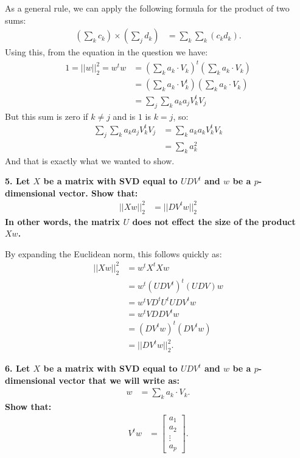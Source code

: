 \documentclass[12pt,hidelinks]{article}
\numberwithin{equation}{section}
\begin{document}
As a general rule, we can apply the following formula for the product of two
sums:
\begin{align}
\left(\sum_k c_k\right) \times \left(\sum_j d_k \right) &= \sum_k \sum_k (c_k d_k).
\end{align}
Using this, from the equation in the question we have:
\begin{align}
1 = || w ||_2^2 = w^t w &= \left(\sum_k a_k \cdot V_k \right)^t \left(\sum_k a_k \cdot V_k \right) \\
&= \left(\sum_k a_k \cdot V_k^t \right) \left(\sum_k a_k \cdot V_k \right) \\
&= \sum_j \sum_k a_k a_j V_k^t V_j
\end{align}
But this sum is zero if $k\neq j$ and is $1$ is $k=j$, so:
\begin{align}
\sum_j \sum_k a_k a_j V_k^t V_j &= \sum_k a_k a_k V_k^t V_k \\
&= \sum_k a_k^2
\end{align}
And that is exactly what we wanted to show.

\vspace*{12pt}

\textbf{5. Let $X$ be a matrix with SVD equal to $UDV^t$ and $w$ be a
$p$-dimensional vector. Show that:
\begin{align}
|| X w ||_2^2 &= || D V^t w ||_2^2
\end{align}
In other words, the matrix $U$ does not effect the size of the product $X w$.}

\vspace*{12pt}

By expanding the Euclidean norm, this follows quickly as:
\begin{align}
|| X w ||_2^2 &= w^t X^t X w\\
&= w^t (U D V^t)^t (U D V) w \\
&= w^t V D^t U^t U D V^t w \\
&= w^t V D D V^t w \\
&= (D V^t w)^t (D V^t w) \\
&= ||D V^t w ||_2^2.
\end{align}

\vspace*{12pt}

\textbf{6. Let $X$ be a matrix with SVD equal to $UDV^t$ and $w$ be a
$p$-dimensional vector that we will write as:}
\begin{align}
w &= \sum_k a_k \cdot V_k.
\end{align}
\textbf{Show that:}
\begin{align}
V^t w &= \begin{bmatrix} a_1 \\ a_2 \\ \vdots \\ a_p \end{bmatrix}.
\end{align}
\end{document}
